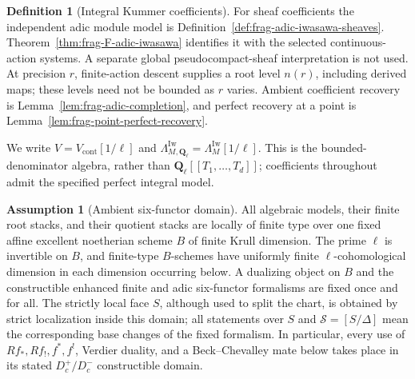 \documentclass[11pt]{article}
\theoremstyle{definition}
\newtheorem{definition}[theorem]{Definition}
\newtheorem{assumption}[theorem]{Assumption}
\theoremstyle{remark}
\begin{document}
\begin{definition}[Integral Kummer coefficients]
For sheaf coefficients the independent adic module model is
Definition~\ref{def:frag-adic-iwasawa-sheaves}.
Theorem~\ref{thm:frag-F-adic-iwasawa} identifies it with the selected
continuous-action systems.  A separate global pseudocompact-sheaf
interpretation is not used.  At precision $r$, finite-action descent
supplies a root level $n(r)$, including derived maps; these levels
need not be bounded as $r$ varies.  Ambient coefficient recovery is
Lemma~\ref{lem:frag-adic-completion}, and perfect recovery at a point
is Lemma~\ref{lem:frag-point-perfect-recovery}.

We write $V=V_{\mathrm{cont}}[1/\ell]$ and
$\Lambda_{M,\mathbf Q_\ell}^{\mathrm{Iw}}=\Lambda_M^{\mathrm{Iw}}[1/\ell]$.
This is the bounded-denominator algebra, rather than
$\mathbf Q_\ell[[T_1,\ldots,T_d]]$; coefficients throughout admit
the specified perfect integral model.
\end{definition}


\begin{assumption}[Ambient six-functor domain]
\label{ass:frag-ambient-six-functor-domain}
All algebraic models, their finite root stacks, and their quotient stacks are
locally of finite type over one fixed affine excellent noetherian scheme
$B$ of finite Krull dimension.  The prime $\ell$ is invertible on $B$, and
finite-type $B$-schemes have uniformly finite $\ell$-cohomological dimension
in each dimension occurring below.  A dualizing object on $B$ and the
constructible enhanced finite and adic six-functor formalisms are fixed once
and for all.  The strictly local face $S$, although used to split the chart,
is obtained by strict localization inside this domain; all statements over
$S$ and $\mathscr S=[S/\Delta]$ mean the corresponding base changes of the
fixed formalism.  In particular, every use of $Rf_*,Rf_!,f^*,f^!$, Verdier
duality, and a Beck--Chevalley mate below takes place in its stated
$D_c^+/D_c^-$ constructible domain.
\end{assumption}
\end{document}
